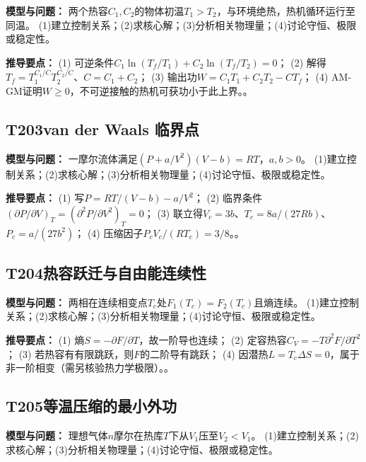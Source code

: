 \textbf{模型与问题：} 两个热容$C_1,C_2$的物体初温$T_1>T_2$，与环境绝热，热机循环运行至同温。 (1)建立控制关系；(2)求核心解；(3)分析相关物理量；(4)讨论守恒、极限或稳定性。

\par\textbf{推导要点：} (1) 可逆条件$C_1\ln(T_f/T_1)+C_2\ln(T_f/T_2)=0$； (2) 解得$T_f=T_1^{C_1/C}T_2^{C_2/C}$、$C=C_1+C_2$； (3) 输出功$W=C_1T_1+C_2T_2-CT_f$； (4) AM-GM证明$W\ge0$，不可逆接触的热机可获功小于此上界。。

\par\medskip

\subsection*{T203\quad van der Waals 临界点}

\textbf{模型与问题：} 一摩尔流体满足$(P+a/V^2)(V-b)=RT$，$a,b>0$。 (1)建立控制关系；(2)求核心解；(3)分析相关物理量；(4)讨论守恒、极限或稳定性。

\par\textbf{推导要点：} (1) 写$P=RT/(V-b)-a/V^2$； (2) 临界条件$(\partial P/\partial V)_T=(\partial^2P/\partial V^2)_T=0$； (3) 联立得$V_c=3b$、$T_c=8a/(27Rb)$、$P_c=a/(27b^2)$； (4) 压缩因子$P_cV_c/(RT_c)=3/8$。。

\par\medskip

\subsection*{T204\quad 热容跃迁与自由能连续性}

\textbf{模型与问题：} 两相在连续相变点$T_c$处$F_1(T_c)=F_2(T_c)$且熵连续。 (1)建立控制关系；(2)求核心解；(3)分析相关物理量；(4)讨论守恒、极限或稳定性。

\par\textbf{推导要点：} (1) 熵$S=-\partial F/\partial T$，故一阶导也连续； (2) 定容热容$C_V=-T\partial^2F/\partial T^2$； (3) 若热容有有限跳跃，则$F$的二阶导有跳跃； (4) 因潜热$L=T_c\Delta S=0$，属于非一阶相变（需另核验热力学极限）。。

\par\medskip

\subsection*{T205\quad 等温压缩的最小外功}

\textbf{模型与问题：} 理想气体$n$摩尔在热库$T$下从$V_1$压至$V_2<V_1$。 (1)建立控制关系；(2)求核心解；(3)分析相关物理量；(4)讨论守恒、极限或稳定性。

